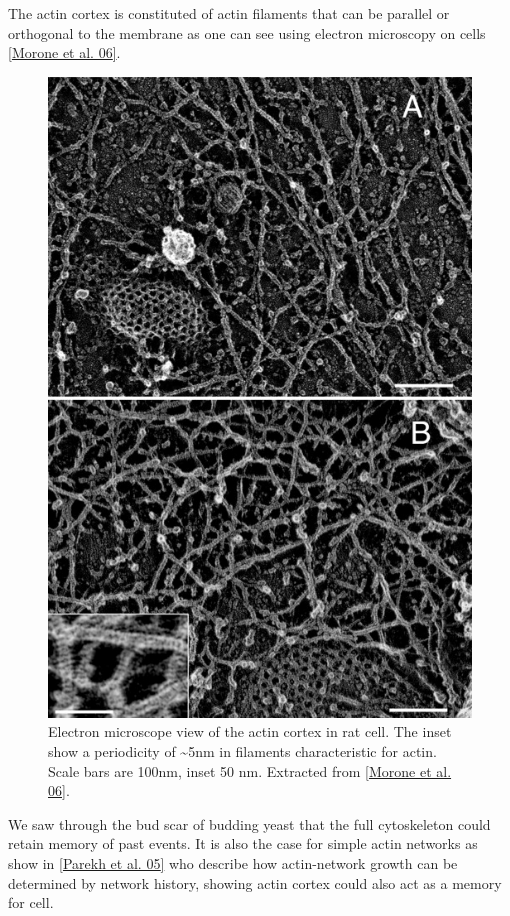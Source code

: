 \documentclass[A4paperpaper,11pt,english]{sphinxmanual}
\begin{document}
The actin cortex is constituted of actin filaments that can be parallel or
orthogonal to the membrane as one can see using electron microscopy on cells
{\hyperref[index-latex:morone2006b]{{[}Morone et al. 06{]}}}.
\begin{figure}[htbp]
\centering
\capstart

\includegraphics[width=0.700\linewidth]{Actin-Cortex-Moronne-2006.jpg}
\caption{Electron microscope view of the actin cortex in rat cell. The inset
show a periodicity of \textasciitilde{}5nm in filaments characteristic for actin.  Scale
bars are 100nm, inset 50 nm. Extracted from {\hyperref[index-latex:morone2006b]{{[}Morone et al. 06{]}}}.}\label{index-latex:fig-electro-cortex}\end{figure}

We saw through the bud scar of budding yeast that the full cytoskeleton could
retain memory of past events. It is also the case for simple actin networks as
show in {\hyperref[index-latex:parekh2005]{{[}Parekh et al. 05{]}}} who describe how actin-network growth can be
determined by network history, showing actin cortex could also act as a memory
for cell.
\end{document}

